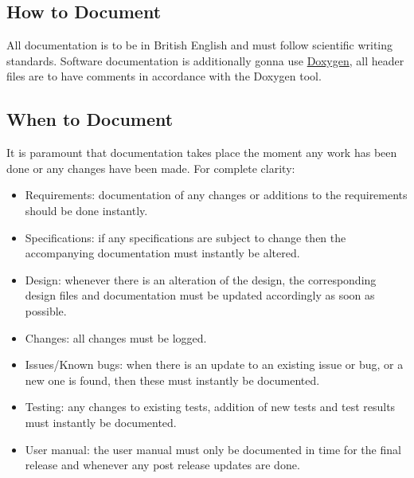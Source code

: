 \subsection{How to Document}

All documentation is to be in British English and must follow scientific writing standards. Software documentation is additionally gonna use \href{https://www.doxygen.nl/}{Doxygen}, all header files are to have comments in accordance with the Doxygen tool.



\subsection{When to Document}

It is paramount that documentation takes place the moment any work has been done or any changes have been made. For complete clarity:
\begin{itemize}
    \item Requirements: documentation of any changes or additions to the requirements should be done instantly.
    \item Specifications: if any specifications are subject to change then the accompanying documentation must instantly be altered.
    \item Design: whenever there is an alteration of the design, the corresponding design files and documentation must be updated accordingly as soon as possible.
    \item Changes: all changes must be logged.
    \item Issues/Known bugs: when there is an update to an existing issue or bug, or a new one is found, then these must instantly be documented.
    \item Testing: any changes to existing tests, addition of new tests and test results must instantly be documented.
    \item User manual: the user manual must only be documented in time for the final release and whenever any post release updates are done.
\end{itemize}

